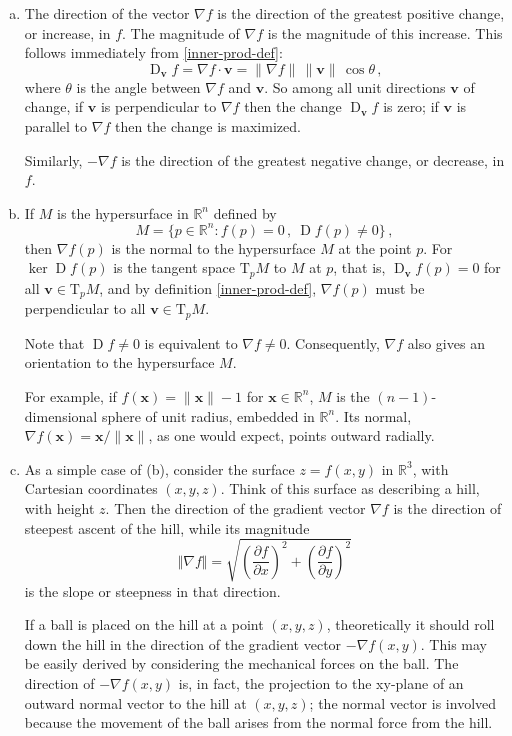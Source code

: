 \documentclass{article}
\newcommand{\real}{\mathbb{R}}
\providecommand{\norm}[1]{\lVert#1\rVert}
\DeclareMathOperator{\D}{D}
\newcommand{\lp}{\left(}
\newcommand{\rp}{\right)}
\newcommand{\vv}{\mathbf{v}}
\newcommand{\vx}{\mathbf{x}}
\begin{document}
\begin{enumerate}[(a)]
\item
The direction of the vector $\nabla f$ is the direction of the greatest positive change, or increase, in $f$.
The magnitude of $\nabla f$ is the magnitude of this increase.
This follows immediately from \eqref{inner-prod-def}:
\[
\D_\vv f = \nabla f \cdot \vv = \norm{\nabla f} \, \norm{\vv} \, \cos \theta\,,
\]
where $\theta$ is the angle between $\nabla f$ and $\vv$.
So among all unit directions $\vv$ of change, if $\vv$ is perpendicular to $\nabla f$
then the change $\D_\vv f$ is zero; if $\vv$ is parallel to $\nabla f$ then the change is maximized.

Similarly,
$-\nabla f$ is the direction of the greatest negative change, or decrease, in $f$.

\item
If $M$ is the hypersurface in $\real^n$ defined by
\[
M = \{ p \in \real^n : f(p) = 0 \,, \: \D f(p) \neq 0 \}\,,
\]
then $\nabla f(p)$ is the normal to the hypersurface $M$ at the point $p$.  For $\ker \D f(p)$ is the tangent space $\mathrm{T}_p M$
to $M$ at $p$, that is, $\D_\vv f(p) = 0$ for all $\vv \in \mathrm{T}_p M$,
and by definition \eqref{inner-prod-def}, $\nabla f(p)$ must be perpendicular to all $\vv \in \mathrm{T}_p M$.

Note that $\D f \neq 0$ is equivalent to $\nabla f \neq 0$.  Consequently, $\nabla f$ also gives
an orientation to the hypersurface $M$.

For example, if $f(\vx) = \norm{\vx} - 1$ for $\vx \in \real^n$,
$M$ is the $(n-1)$-dimensional sphere of unit radius, embedded in $\real^n$.
Its normal, $\nabla f(\vx) = \vx/\norm{\vx}$, as one would expect, points outward radially.

\item
As a simple case of (b), consider the 
surface $z = f(x, y)$ in $\real^3$, with Cartesian coordinates $(x, y, z)$.
Think of this surface as describing a hill, with height $z$.
Then the direction of the gradient vector $\nabla f$
is the direction of steepest ascent of the hill, while its
magnitude 
\[
\Vert \nabla f \Vert = \sqrt{ \lp \frac{\partial f}{\partial x}
\rp^2 + \lp \frac{\partial f}{\partial y} \rp^2 }
\]
is the slope or steepness in that direction. 

If a ball is placed on the hill at a point $(x, y, z)$,
theoretically it should roll down the hill in the direction of the gradient
vector $-\nabla f(x, y)$.  This may be easily derived by considering the mechanical forces
on the ball.  The direction of $-\nabla f(x, y)$ is, in fact, the projection
to the xy-plane of an outward normal vector to the hill at $(x, y, z)$;
the normal vector is involved because the movement of the ball
arises from the normal force from the hill.


\end{enumerate}
\end{document}
